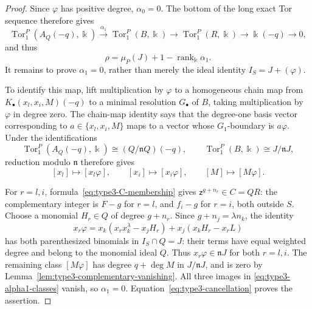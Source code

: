 \documentclass[10pt]{amsart}
\theoremstyle{plain}
\begin{document}
\begin{proof}
Since \(\varphi\) has positive degree, \(\alpha_0=0\).
The bottom of the long exact Tor sequence therefore gives
\[
\operatorname{Tor}_1^P(A_Q(-q),\Bbbk)
 \xrightarrow{\alpha_1}\operatorname{Tor}_1^P(B,\Bbbk)
 \longrightarrow\operatorname{Tor}_1^P(R,\Bbbk)
 \longrightarrow\Bbbk(-q)\longrightarrow0,
\]
and thus
\begin{equation}\label{eq:type3-cancellation}
\rho=\mu_P(J)+1-\operatorname{rank}_{\Bbbk}\alpha_1.
\end{equation}
It remains to prove \(\alpha_1=0\), rather than merely the ideal
identity \(I_S=J+(\varphi)\).

To identify this map, lift multiplication by \(\varphi\) to a homogeneous
chain map from \(K_\bullet(x_l,x_i,M)(-q)\) to a minimal resolution
\(G_\bullet\) of \(B\), taking multiplication by \(\varphi\) in degree
zero.  The chain-map identity says that the degree-one basis vector
corresponding to \(a\in\{x_l,x_i,M\}\) maps to a vector whose
\(G_1\)-boundary is \(a\varphi\).  Under the identifications
\[
\operatorname{Tor}_1^P(A_Q(-q),\Bbbk)
 \cong(Q/\mathfrak nQ)(-q),
\qquad
\operatorname{Tor}_1^P(B,\Bbbk)\cong J/\mathfrak nJ,
\]
reduction modulo \(\mathfrak n\) therefore gives
\begin{equation}\label{eq:type3-alpha1-classes}
[x_l]\longmapsto[x_l\varphi],\qquad
[x_i]\longmapsto[x_i\varphi],\qquad
[M]\longmapsto[M\varphi].
\end{equation}

For \(r=l,i\), formula~\eqref{eq:type3-C-membership} gives
\(\mathsf z^{g+n_r}\in C=QR\): the complementary integer is \(F-g\)
for \(r=l\), and \(f_i-g\) for \(r=i\), both outside \(S\).
Choose a monomial \(H_r\in Q\) of degree \(g+n_r\).  Since
\(g+n_j=\lambda n_k\), the identity
\begin{equation}\label{eq:type3-binomial-nullity}
x_r\varphi
=x_k(x_rx_k^\lambda-x_jH_r)
 +x_j(x_kH_r-x_rL)
\end{equation}
has both parenthesized binomials in \(I_S\cap Q=J\): their terms
have equal weighted degree and belong to the monomial ideal \(Q\).
Thus \(x_r\varphi\in\mathfrak nJ\) for both \(r=l,i\).
The remaining class \([M\varphi]\) has degree \(q+\deg M\) in
\(J/\mathfrak nJ\), and is zero by
Lemma~\ref{lem:type3-complementary-vanishing}.
All three images in \eqref{eq:type3-alpha1-classes} vanish, so
\(\alpha_1=0\).  Equation~\eqref{eq:type3-cancellation} proves the
assertion.
\end{proof}
\end{document}
